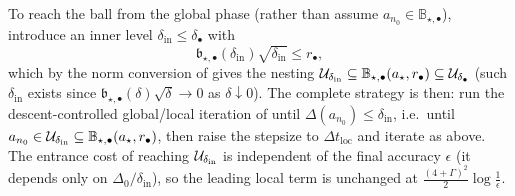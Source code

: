 \begin{remark}
To reach the ball from the global phase (rather than assume $a_{n_0}\in\mathbb B_{\star,\bullet}$),
introduce an inner level $\delta_{\mathrm{in}}\leq\delta_\bullet$ with
\begin{equation}
\label{eq:inner-level-reach}
    \mathfrak b_{\star,\bullet}(\delta_{\mathrm{in}})\sqrt{\delta_{\mathrm{in}}}\leq r_\bullet ,
\end{equation}
which by the norm conversion of  gives the nesting
$\mathcal{U}_{\delta_{\mathrm{in}}}\subseteq\mathbb B_{\star,\bullet}(a_\star,r_\bullet)\subseteq\mathcal{U}_{\delta_\bullet}$
(such $\delta_{\mathrm{in}}$ exists since $\mathfrak b_{\star,\bullet}(\delta)\sqrt\delta\to0$ as
$\delta\downarrow0$). The complete strategy is then: run the descent-controlled global/local iteration
of  until $\Delta(a_{n_0})\leq\delta_{\mathrm{in}}$, i.e.\ until
$a_{n_0}\in\mathcal{U}_{\delta_{\mathrm{in}}}\subseteq\mathbb B_{\star,\bullet}(a_\star,r_\bullet)$, then
raise the stepsize to $\Delta t_{\mathrm{loc}}$ and iterate as above. The entrance cost of reaching
$\mathcal{U}_{\delta_{\mathrm{in}}}$ is independent of the final accuracy $\epsilon$ (it depends only on
$\Delta_0/\delta_{\mathrm{in}}$), so the leading local term is unchanged at
$\tfrac{(4+\Gamma)^2}2\log\tfrac1\epsilon$.


\end{remark}
